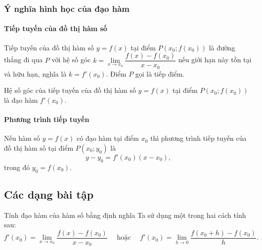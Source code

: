 \begin{tomtat}
	\subsubsection{Ý nghĩa hình học của đạo hàm}
	\paragraph{Tiếp tuyến của đồ thị hàm số}
	\begin{dn}
	Tiếp tuyến của đồ thị hàm số $y=f(x)$ tại điểm $P(x_0;f(x_0))$ là đường thẳng đi qua $P$ với hệ số góc $k=\lim\limits_{x \to x_0} \dfrac{f(x)-f(x_0)}{x-x_0}$ nếu giới hạn này tồn tại và hữu hạn, nghĩa là $k=f'(x_0)$. Điểm $P$ gọi là tiếp điểm.
	\end{dn}
	\begin{nx}
	Hệ số góc của tiếp tuyến của đồ thị hàm số $y=f(x)$ tại điểm $P(x_0;f(x_0))$ là đạo hàm $f'(x_0)$.
	\end{nx}
	\paragraph{Phương trình tiếp tuyến}
	\begin{dn}
	Nếu hàm số $y=f(x)$ có đạo hàm tại điểm $x_0$ thì phương trình tiếp tuyến của đồ thị hàm số tại điểm $P(x_0;y_0)$ là 
	$$y-y_0=f'(x_0)(x-x_0),$$
	trong đó $y_0=f(x_0)$.
	\end{dn}	
\end{tomtat}
\subsection{Các dạng bài tập}
\begin{dang}{Tính đạo hàm của hàm số bằng định nghĩa}
	Ta sử dụng một trong hai cách tính sau:
	\[f'(x_0)=\lim\limits_{x \to x_0} \dfrac{f(x)-f(x_0)}{x-x_0}\quad \text{ hoặc }\quad f'(x_0)=\lim\limits_{h \to 0} \dfrac{f(x_0+h)-f(x_0)}{h}.\]
\end{dang}
